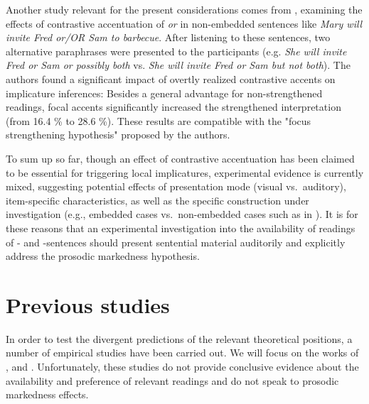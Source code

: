 \documentclass[fleqn,reqno,10pt]{article}
\newcommand{\as}{\acro{as}}
\renewcommand{\es}{\acro{es}}
\begin{document}
Another study relevant for the present considerations comes from
\citet{SchwarzClifton2008:Strengthening-o}, examining the effects of
contrastive accentuation of \emph{or} in non-embedded sentences like
{\it Mary will invite Fred or/OR Sam to barbecue}. After listening to
these sentences, two alternative paraphrases were presented to
the participants (e.g. {\it She will invite Fred or Sam or possibly both} vs. {\it
  She will invite Fred or Sam but not both}).  The authors found a
significant impact of overtly realized contrastive accents on
implicature inferences: Besides a general advantage for
non-strengthened readings, focal accents significantly increased the
strengthened interpretation (from 16.4 \% to 28.6 \%). These results
are compatible with the "focus strengthening hypothesis" proposed by
the authors.

To sum up so far, though an effect of contrastive accentuation has
been claimed to be essential for triggering local implicatures,
experimental evidence is currently mixed, suggesting potential effects
of presentation mode (visual vs.~auditory), item-specific
characteristics, as well as the specific construction under
investigation (e.g., embedded cases vs.~non-embedded cases such as in
\citet{SchwarzClifton2008:Strengthening-o}). It is for these reasons
that an experimental investigation into the availability of readings
of \as- and \es-sentences should present sentential material
auditorily and explicitly address the prosodic markedness
hypothesis. 

\section{Previous studies}
\label{sec:previous-studies}

In order to test the divergent predictions of the relevant theoretical
positions, a number of empirical studies have been carried out. We
will focus on the works of
\citet{GeurtsPouscoulous2009:Embedded-Implic},
\citet{CliftonDube2010:Embedded-Implic} and
\citet{ChemlaSpector2010:Experimental-Ev} \citep[c.f.][for related
discussion]{BenzGotzner2014:Embedded-implic}. Unfortunately, these
studies do not provide conclusive evidence about the availability and
preference of relevant readings and do not speak to prosodic
markedness effects.

\subsection{\citet{GeurtsPouscoulous2009:Embedded-Implic}}
\label{sec:Geurts-and-Pouscoulous}
\end{document}
